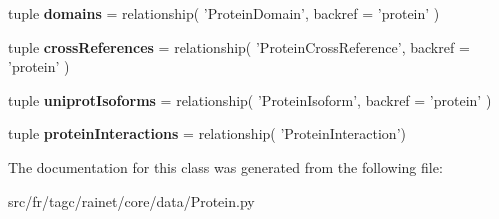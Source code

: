 \begin{DoxyCompactItemize}
\item 
\hypertarget{classsrc_1_1fr_1_1tagc_1_1rainet_1_1core_1_1data_1_1Protein_1_1Protein_a86b300e21a26b488d9c4e33ec3580aca}{tuple {\bfseries domains} = relationship( 'Protein\-Domain', backref = 'protein' )}\label{classsrc_1_1fr_1_1tagc_1_1rainet_1_1core_1_1data_1_1Protein_1_1Protein_a86b300e21a26b488d9c4e33ec3580aca}

\item 
\hypertarget{classsrc_1_1fr_1_1tagc_1_1rainet_1_1core_1_1data_1_1Protein_1_1Protein_a2f9a54115763a66222f105ef2530d48f}{tuple {\bfseries cross\-References} = relationship( 'Protein\-Cross\-Reference', backref = 'protein' )}\label{classsrc_1_1fr_1_1tagc_1_1rainet_1_1core_1_1data_1_1Protein_1_1Protein_a2f9a54115763a66222f105ef2530d48f}

\item 
\hypertarget{classsrc_1_1fr_1_1tagc_1_1rainet_1_1core_1_1data_1_1Protein_1_1Protein_afc14f27ac7c23f53256373608f8f1e24}{tuple {\bfseries uniprot\-Isoforms} = relationship( 'Protein\-Isoform', backref = 'protein' )}\label{classsrc_1_1fr_1_1tagc_1_1rainet_1_1core_1_1data_1_1Protein_1_1Protein_afc14f27ac7c23f53256373608f8f1e24}

\item 
\hypertarget{classsrc_1_1fr_1_1tagc_1_1rainet_1_1core_1_1data_1_1Protein_1_1Protein_a6c96a45d677b57f17b522ae362c329e5}{tuple {\bfseries protein\-Interactions} = relationship( 'Protein\-Interaction')}\label{classsrc_1_1fr_1_1tagc_1_1rainet_1_1core_1_1data_1_1Protein_1_1Protein_a6c96a45d677b57f17b522ae362c329e5}

\end{DoxyCompactItemize}


The documentation for this class was generated from the following file\-:\begin{DoxyCompactItemize}
\item 
src/fr/tagc/rainet/core/data/Protein.\-py\end{DoxyCompactItemize}
